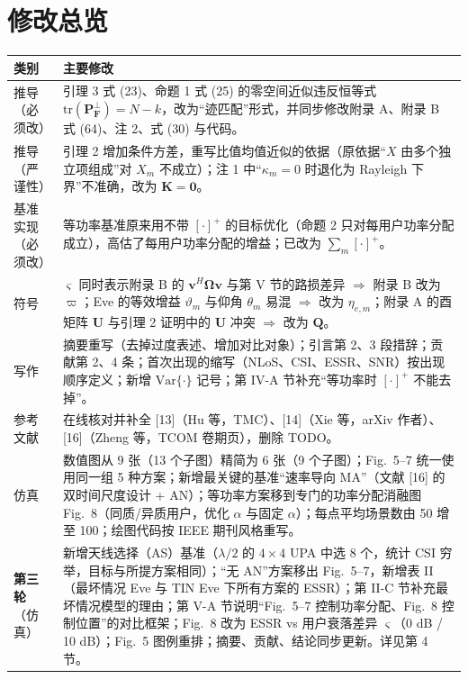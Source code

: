 \documentclass[11pt,a4paper]{ctexart}
\newcommand{\bOm}{\bm\Omega}
\newcommand{\tr}{\mathrm{tr}}
\begin{document}
\section*{修改总览}
\begin{longtable}{p{3.1cm}p{12.6cm}}
\toprule
类别 & 主要修改 \\ \midrule
推导（必须改） & 引理 3 式 (23)、命题 1 式 (25) 的零空间近似违反恒等式 $\tr(\mathbf P_{\mathbf F}^\perp)=N-k$，改为“迹匹配”形式，并同步修改附录 A、附录 B 式 (64)、注 2、式 (30) 与代码。\\
推导（严谨性） & 引理 2 增加条件方差，重写比值均值近似的依据（原依据“$X$ 由多个独立项组成”对 $X_m$ 不成立）；注 1 中“$\kappa_m=0$ 时退化为 Rayleigh 下界”不准确，改为 $\mathbf K=\mathbf 0$。\\
基准实现（必须改） & 等功率基准原来用不带 $[\cdot]^+$ 的目标优化（命题 2 只对每用户功率分配成立），高估了每用户功率分配的增益；已改为 $\sum_m[\cdot]^+$。\\
符号 & $\varsigma$ 同时表示附录 B 的 $\mathbf v^H\bOm\mathbf v$ 与第 V 节的路损差异 $\Rightarrow$ 附录 B 改为 $\varpi$；Eve 的等效增益 $\vartheta_m$ 与仰角 $\theta_m$ 易混 $\Rightarrow$ 改为 $\eta_{e,m}$；附录 A 的酉矩阵 $\mathbf U$ 与引理 2 证明中的 $\mathbf U$ 冲突 $\Rightarrow$ 改为 $\mathbf Q$。\\
写作 & 摘要重写（去掉过度表述、增加对比对象）；引言第 2、3 段措辞；贡献第 2、4 条；首次出现的缩写（NLoS、CSI、ESSR、SNR）按出现顺序定义；新增 $\mathrm{Var}\{\cdot\}$ 记号；第 IV-A 节补充“等功率时 $[\cdot]^+$ 不能去掉”。\\
参考文献 & 在线核对并补全 [13]（Hu 等，TMC）、[14]（Xie 等，arXiv 作者）、[16]（Zheng 等，TCOM 卷期页），删除 TODO。\\
仿真 & 数值图从 9 张（13 个子图）精简为 6 张（9 个子图）；Fig.~5--7 统一使用同一组 5 种方案；新增最关键的基准“速率导向 MA”（文献 [16] 的双时间尺度设计 + AN）；等功率方案移到专门的功率分配消融图 Fig.~8（同质/异质用户，优化 $\alpha$ 与固定 $\alpha$）；每点平均场景数由 50 增至 100；绘图代码按 IEEE 期刊风格重写。\\
\textbf{第三轮}（仿真） & 新增天线选择（AS）基准（$\lambda/2$ 的 $4\times4$ UPA 中选 8 个，统计 CSI 穷举，目标与所提方案相同）；“无 AN”方案移出 Fig.~5--7，新增表 II（最坏情况 Eve 与 TIN Eve 下所有方案的 ESSR）；第 II-C 节补充最坏情况模型的理由；第 V-A 节说明“Fig.~5--7 控制功率分配、Fig.~8 控制位置”的对比框架；Fig.~8 改为 ESSR vs 用户衰落差异 $\varsigma$（0 dB / 10 dB）；Fig.~5 图例重排；摘要、贡献、结论同步更新。详见第 4 节。\\
\bottomrule
\end{longtable}
\end{document}
